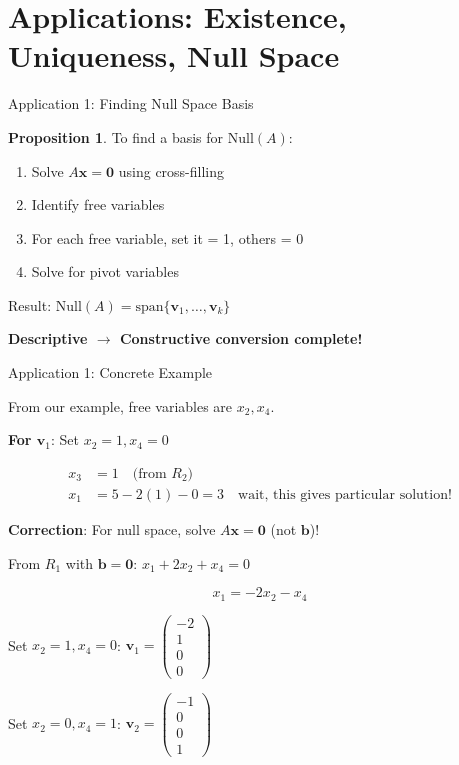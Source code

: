 \documentclass[10pt]{beamer}
\theoremstyle{definition}
\newtheorem{prop}{Proposition}[section]
\newcommand{\x}[1]{\alert{\textbf{#1}}}
\begin{document}
\section{Applications: Existence, Uniqueness, Null Space}

\begin{frame}{Application 1: Finding Null Space Basis}

\begin{prop}
To find a basis for $\text{Null}(A)$:

\begin{enumerate}
\item Solve $A\mathbf{x} = \mathbf{0}$ using cross-filling
\item Identify free variables
\item For each free variable, set it = 1, others = 0
\item Solve for pivot variables
\end{enumerate}

Result: $\text{Null}(A) = \text{span}\{\mathbf{v}_1, \ldots, \mathbf{v}_k\}$

\x{Descriptive $\to$ Constructive conversion complete!}
\end{prop}

\end{frame}

\begin{frame}{Application 1: Concrete Example}

From our example, free variables are $x_2, x_4$.

\vspace{1em}

\x{For $\mathbf{v}_1$}: Set $x_2 = 1, x_4 = 0$

\begin{align*}
x_3 &= 1 \quad \text{(from } R_2\text{)} \\
x_1 &= 5 - 2(1) - 0 = 3 \quad \text{wait, this gives particular solution!}
\end{align*}

\x{Correction}: For null space, solve $A\mathbf{x} = \mathbf{0}$ (not $\mathbf{b}$)!

\vspace{0.5em}

From $R_1$ with $\mathbf{b} = \mathbf{0}$: $x_1 + 2x_2 + x_4 = 0$

$$x_1 = -2x_2 - x_4$$

Set $x_2 = 1, x_4 = 0$: $\mathbf{v}_1 = \begin{pmatrix} -2 \\ 1 \\ 0 \\ 0 \end{pmatrix}$

Set $x_2 = 0, x_4 = 1$: $\mathbf{v}_2 = \begin{pmatrix} -1 \\ 0 \\ 0 \\ 1 \end{pmatrix}$

\end{frame}
\end{document}

